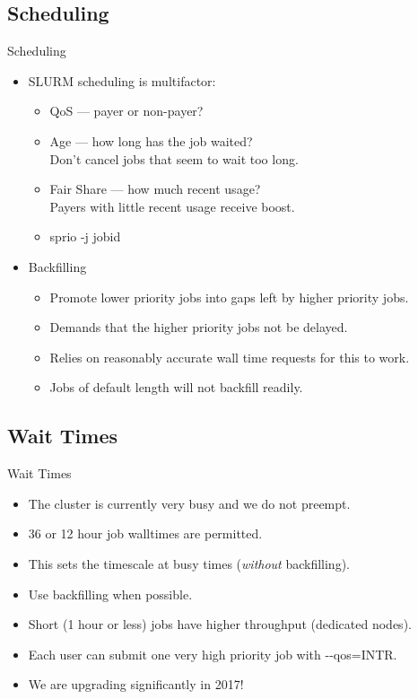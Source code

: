 \subsection{Scheduling}
\begin{frame}{Scheduling}
\begin{itemize}
\item{SLURM scheduling is multifactor:}
  \pause
\begin{itemize}
\item{\alert{QoS} --- payer or non-payer?}
  \pause
\item{\alert{Age} --- how long has the job waited?\hfill\\\qquad
  \alert{Don't cancel jobs that seem to wait too long.}}
  \pause
\item{\alert{Fair Share} --- how much recent usage?\hfill\\\qquad
  \alert{Payers with little recent usage receive boost.}}
  \pause
\item{\alert{sprio -j jobid}}
\end{itemize}
\pause
\item{\alert{Backfilling}}
\begin{itemize}
  \item{Promote lower priority jobs into gaps left by higher priority jobs.}
    \item{Demands that the higher priority jobs not be delayed.}
    \item{Relies on reasonably accurate wall time requests for this to work.}
      \item{Jobs of default length will not backfill readily.}
\end{itemize}
\end{itemize}
\end{frame}

\subsection{Wait Times}
\begin{frame}{Wait Times}
  \begin{itemize}
  \item{The cluster is currently very busy and we do not preempt.}
  \item{36 or 12 hour job walltimes are permitted.}
    \pause
  \item{\alert{This sets the timescale at busy times (\emph{without} backfilling).}}
    \pause
  \item{Use backfilling when possible.}
  \item{Short (1 hour or less) jobs have higher throughput (dedicated nodes).}
  \item{Each user can submit \alert{one} very high priority job with \alert{-{}-qos=INTR}.}
    \pause
    \item{We are upgrading significantly in 2017!}
\end{itemize}
\end{frame}

